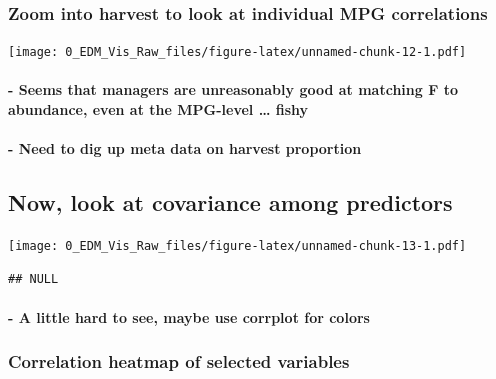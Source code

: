 \documentclass[]{article}
\let\oldparagraph\paragraph
\renewcommand{\paragraph}[1]{\oldparagraph{#1}\mbox{}}
\begin{document}
\hypertarget{zoom-into-harvest-to-look-at-individual-mpg-correlations}{%
\subsubsection{Zoom into harvest to look at individual MPG
correlations}\label{zoom-into-harvest-to-look-at-individual-mpg-correlations}}

\texttt{[image: 0\_EDM\_Vis\_Raw\_files/figure-latex/unnamed-chunk-12-1.pdf]}

\hypertarget{seems-that-managers-are-unreasonably-good-at-matching-f-to-abundance-even-at-the-mpg-level-fishy}{%
\paragraph{- Seems that managers are unreasonably good at matching F to
abundance, even at the MPG-level \ldots{}
fishy}\label{seems-that-managers-are-unreasonably-good-at-matching-f-to-abundance-even-at-the-mpg-level-fishy}}

\hypertarget{need-to-dig-up-meta-data-on-harvest-proportion}{%
\paragraph{- Need to dig up meta data on harvest
proportion}\label{need-to-dig-up-meta-data-on-harvest-proportion}}

\hypertarget{now-look-at-covariance-among-predictors}{%
\subsection{Now, look at covariance among
predictors}\label{now-look-at-covariance-among-predictors}}

\texttt{[image: 0\_EDM\_Vis\_Raw\_files/figure-latex/unnamed-chunk-13-1.pdf]}

\begin{verbatim}
## NULL
\end{verbatim}

\hypertarget{a-little-hard-to-see-maybe-use-corrplot-for-colors}{%
\paragraph{- A little hard to see, maybe use corrplot for
colors}\label{a-little-hard-to-see-maybe-use-corrplot-for-colors}}

\hypertarget{correlation-heatmap-of-selected-variables}{%
\subsubsection{Correlation heatmap of selected
variables}\label{correlation-heatmap-of-selected-variables}}
\end{document}
